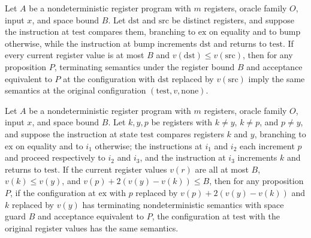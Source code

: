 \begin{theorem}
\label{Complexity.LogProg.nsem_copy}
\leanok
{}
Let $A$ be a nondeterministic register program with $m$ registers, oracle family $O$,
input $x$, and space bound $B$. Let $\mathrm{dst}$ and $\mathrm{src}$ be distinct
registers, and suppose the instruction at $\mathrm{test}$ compares them, branching to
$\mathrm{ex}$ on equality and to $\mathrm{bump}$ otherwise, while the instruction at
$\mathrm{bump}$ increments $\mathrm{dst}$ and returns to $\mathrm{test}$. If every
current register value is at most $B$ and $v(\mathrm{dst})\le v(\mathrm{src})$, then for
any proposition $P$, terminating semantics under the register bound $B$ and acceptance
equivalent to $P$ at the configuration with $\mathrm{dst}$ replaced by $v(\mathrm{src})$
imply the same semantics at the original configuration
$(\mathrm{test},v,\mathrm{none})$.
\end{theorem}

\begin{theorem}
\label{Complexity.LogProg.nsem_addTwice}
\leanok
{}
Let $A$ be a nondeterministic register program with $m$ registers, oracle family $O$,
input $x$, and space bound $B$. Let $k,y,p$ be registers with $k\ne y$, $k\ne p$, and
$p\ne y$, and suppose the instruction at state $\mathrm{test}$ compares registers $k$
and $y$, branching to $\mathrm{ex}$ on equality and to $i_1$ otherwise; the instructions
at $i_1$ and $i_2$ each increment $p$ and proceed respectively to $i_2$ and $i_3$, and
the instruction at $i_3$ increments $k$ and returns to $\mathrm{test}$. If the current
register values $v(r)$ are all at most $B$, $v(k)\le v(y)$, and $v(p)+2(v(y)-v(k))\le
B$, then for any proposition $P$, if the configuration at $\mathrm{ex}$ with $p$
replaced by $v(p)+2(v(y)-v(k))$ and $k$ replaced by $v(y)$ has terminating
nondeterministic semantics with space guard $B$ and acceptance equivalent to $P$, the
configuration at $\mathrm{test}$ with the original register values has the same
semantics.
\end{theorem}

